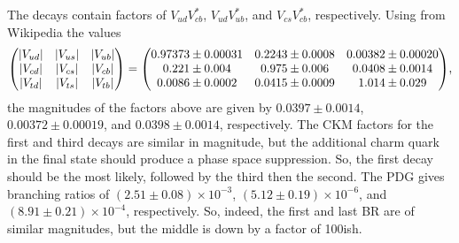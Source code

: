 \documentclass[12pt]{article}
\begin{document}
The decays contain factors of $V_{ud}V_{cb}^*$, $V_{ud}V_{ub}^*$, and $V_{cs}V_{cb}^*$, respectively. Using from Wikipedia the values
\[ \mqty(\abs{V_{ud}}&\abs{V_{us}}&\abs{V_{ub}}\\\abs{V_{cd}}&\abs{V_{cs}}&\abs{V_{cb}}\\\abs{V_{td}}&\abs{V_{ts}}&\abs{V_{tb}}) = \mqty(0.97373\pm0.00031&0.2243\pm0.0008&0.00382\pm0.00020\\0.221\pm0.004&0.975\pm0.006&0.0408\pm0.0014\\0.0086\pm0.0002&0.0415\pm0.0009&1.014\pm0.029), \]
the magnitudes of the factors above are given by $0.0397 \pm0.0014$, $0.00372\pm0.00019$, and $0.0398\pm0.0014$, respectively. The CKM factors for the first and third decays are similar in magnitude, but the additional charm quark in the final state should produce a phase space suppression. So, the first decay should be the most likely, followed by the third then the second.
The PDG gives branching ratios of $(2.51\pm0.08)\times10^{-3}$, $(5.12\pm0.19)\times10^{-6}$, and $(8.91\pm0.21)\times10^{-4}$, respectively. So, indeed, the first and last BR are of similar magnitudes, but the middle is down by a factor of 100ish.
\end{document}
